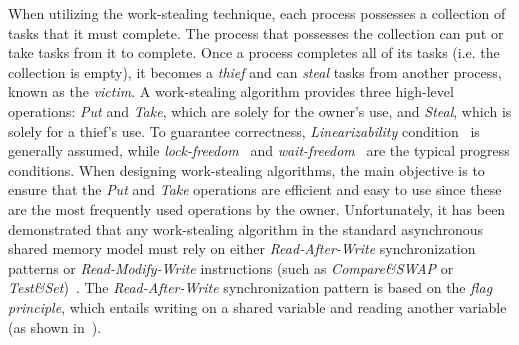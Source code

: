 When utilizing the work-stealing technique, each process possesses a collection of tasks that it must complete. The process that possesses the collection can put or take tasks from it to complete. Once a process completes all of its tasks (i.e. the collection is empty), it becomes a \emph{thief} and can \emph{steal} tasks from another process, known as the \emph{victim}. A work-stealing algorithm provides three high-level operations: \emph{Put} and \emph{Take}, which are solely for the owner's use, and \emph{Steal}, which is solely for a thief's use. To guarantee correctness, \emph{Linearizability} condition~\cite{DBLP_journals_toplas_HerlihyW90}  is generally assumed, while \emph{lock-freedom}~\cite{DBLP_journals_toplas_HerlihyW90}  and \emph{wait-freedom}~\cite{DBLP_journals_toplas_Herlihy91} are the typical progress conditions. When designing work-stealing algorithms, the main objective is to ensure that the \emph{Put} and \emph{Take} operations are efficient and easy to use since these are the most frequently used operations by the owner. Unfortunately, it has been demonstrated that any work-stealing algorithm in the standard asynchronous shared memory model must rely on either \emph{Read-After-Write} synchronization patterns or \emph{Read-Modify-Write} instructions (such as \textit{Compare\&SWAP} or \textit{Test\&Set})~\cite{DBLP_conf_popl_AttiyaGHKMV11}. The \emph{Read-After-Write} synchronization pattern is based on the \emph{flag principle}, which entails writing on a shared variable and reading another variable (as shown in~\cite{DBLP_books_daglib_0020056}).

